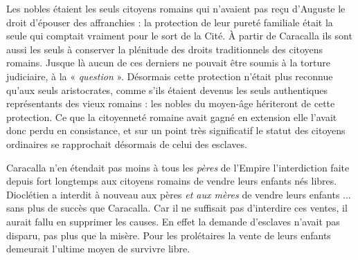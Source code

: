  Les nobles étaient les seuls citoyens romains qui n'avaient pas reçu d'Auguste le droit d'épouser des affranchies : la protection de leur pureté familiale était la seule qui comptait vraiment pour le sort de la Cité. À partir de Caracalla ils sont aussi les seuls à conserver la plénitude des droits traditionnels des citoyens romains. Jusque là aucun de ces derniers ne pouvait être soumis à la torture judiciaire, à la « \emph{question} ». Désormais cette protection n'était plus reconnue qu'aux seuls aristocrates, comme s'ils étaient devenus les seuls authentiques représentants des vieux romains : les nobles du moyen-âge hériteront de cette protection. Ce que la citoyenneté romaine avait gagné en extension elle l'avait donc perdu en consistance, et sur un point très significatif le statut des citoyens ordinaires se rapprochait désormais de celui des esclaves.

 Caracalla n'en étendait pas moins à tous les \emph{pères} de l'Empire l'interdiction faite depuis fort longtemps aux citoyens romains de vendre leurs enfants nés libres. Dioclétien a interdit à nouveau aux pères \emph{et aux mères} de vendre leurs enfants ... sans plus de succès que Caracalla. Car il ne suffisait pas d'interdire ces ventes, il aurait fallu en supprimer les causes. En effet la demande d'esclaves n'avait pas disparu, pas plus que la misère. Pour les prolétaires la vente de leurs enfants demeurait l'ultime moyen de survivre libre.
 
 